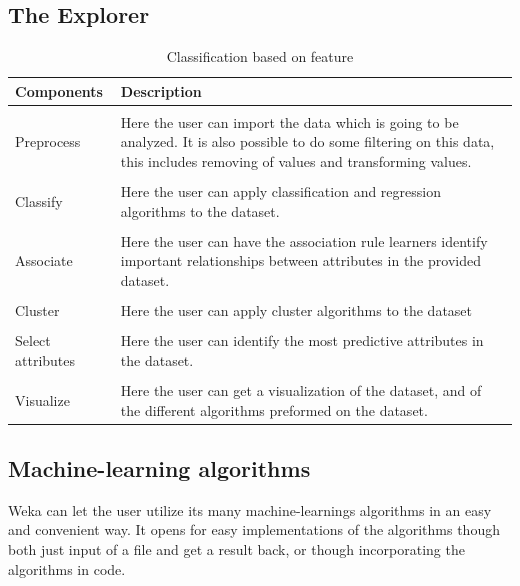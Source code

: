 \subsection{The Explorer}
\begin{table}[H]
\centering
\begin{tabularx}{1.0\textwidth}{ l p{9.3cm} }
  \textbf{Components} & \textbf{Description} \\
  \hline \\ [-1.5ex]
  Preprocess & Here the user can import the data which is going to be analyzed. It is also possible to do some filtering on this data, this includes removing of values and transforming values. \\
  \hline \\ [-1.5ex]
  Classify & Here the user can apply classification and regression algorithms to the dataset. \\
  \hline \\ [-1.5ex]
  Associate & Here the user can have the association rule learners identify important relationships between attributes in the provided dataset. \\
  \hline \\ [-1.5ex]
  Cluster & Here the user can apply cluster algorithms to the dataset \\
  \hline \\ [-1.5ex]
  Select attributes & Here the user can identify the most predictive attributes in the dataset. \\
  \hline \\ [-1.5ex]
  Visualize & Here the user can get a visualization of the dataset, and of the different algorithms preformed on the dataset. \\
\end{tabularx}
\caption{Classification based on feature}
\label{table:nosql-calssifications}
\end{table}

\subsection{Machine-learning algorithms}
Weka can let the user utilize its many machine-learnings algorithms in an easy and convenient way. It opens for easy implementations of the algorithms though both just input of a file and get a result back, or though incorporating the algorithms in code.

